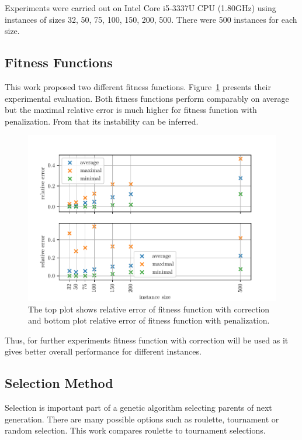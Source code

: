 \documentclass{article}
\begin{document}
Experiments were carried out on Intel Core i5-3337U CPU (1.80GHz)
using instances of sizes 32, 50, 75, 100, 150, 200, 500.
There were 500 instances for each size.

\subsection{Fitness Functions}

This work proposed two different fitness functions.
Figure~\ref{fitness} presents their experimental evaluation.
Both fitness functions perform comparably on average
but the maximal relative error is much higher
for fitness function with penalization.
From that its instability can be inferred.

\begin{figure}[ht]
\vskip 0.2in
\begin{center}
\centerline{\includegraphics[width=\columnwidth]{fitness}}
\caption{The top plot shows relative error of fitness function with
correction and bottom plot relative error of fitness function with
penalization.}
\label{fitness}
\end{center}
\vskip -0.2in
\end{figure}

Thus, for further experiments fitness function with correction will be used
as it gives better overall performance for different instances.

\subsection{Selection Method}

Selection is important part of a genetic algorithm selecting parents of next
generation.
There are many possible options such as roulette, tournament
or random selection.
This work compares roulette to tournament selections.
\end{document}
